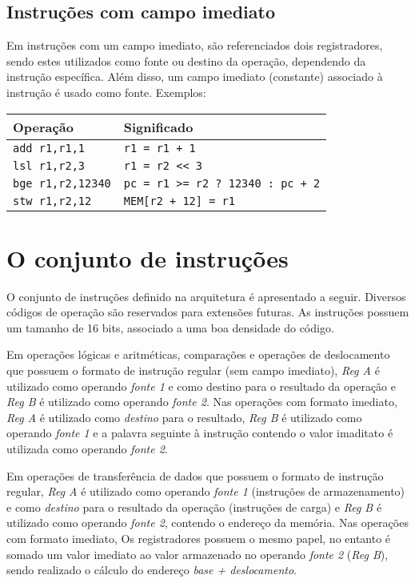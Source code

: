 \documentclass[11pt,a4paper]{report}
\begin{document}
\subsection{Instruções com campo imediato}

Em instruções com um campo imediato, são referenciados dois registradores,
sendo estes utilizados como fonte ou destino da operação, dependendo
da instrução específica. Além disso, um campo imediato (constante)
associado à instrução é usado como fonte. Exemplos:

\begin{table}[htb!]
\centering
\begin{tabular}{|p{5.0cm}|p{8.0cm}|}
\hline
\bf{Operação} & \bf{Significado} \\ \hline \hline
\texttt{add r1,r1,1} & \verb|r1 = r1 + 1| \\ \hline
\texttt{lsl r1,r2,3} & \verb|r1 = r2 << 3| \\ \hline
\texttt{bge r1,r2,12340} & \verb|pc = r1 >= r2 ? 12340 : pc + 2| \\ \hline
\texttt{stw r1,r2,12} & \verb|MEM[r2 + 12] = r1| \\ \hline
\end{tabular}
\end{table}


\section{O conjunto de instruções}

O conjunto de instruções definido na arquitetura é apresentado a seguir.
Diversos códigos de operação são reservados para extensões futuras. As
instruções possuem um tamanho de 16 bits, associado a uma boa densidade
do código.

Em operações lógicas e aritméticas, comparações e operações de deslocamento
que possuem o formato de instrução regular (sem campo imediato),
\textit{Reg A} é utilizado como operando \textit{fonte 1} e como destino
para o resultado da operação e \textit{Reg B} é utilizado como operando
\textit{fonte 2}. Nas operações com formato imediato, \textit{Reg A} é
utilizado como \textit{destino} para o resultado, \textit{Reg B} é
utilizado como operando \textit{fonte 1} e a palavra seguinte à instrução
contendo o valor imaditato é utilizada como operando \textit{fonte 2}.

Em operações de transferência de dados que possuem o formato de instrução
regular, \textit{Reg A} é utilizado como operando \textit{fonte 1}
(instruções de armazenamento) e como \textit{destino} para o resultado
da operação (instruções de carga) e \textit{Reg B} é utilizado como
operando \textit{fonte 2}, contendo o endereço da memória. Nas operações
com formato imediato, Os registradores possuem o mesmo papel, no entanto
é somado um valor imediato ao valor armazenado no operando \textit{fonte 2}
(\textit{Reg B}), sendo realizado o cálculo do endereço \textit{base
+ deslocamento}.
\end{document}
